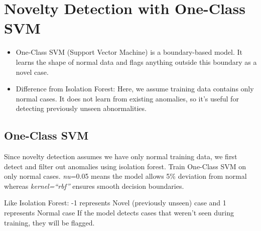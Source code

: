\documentclass[11pt]{article}
\providecommand{\tightlist}{%
      \setlength{\itemsep}{0pt}\setlength{\parskip}{0pt}}
\begin{document}
    \section{Novelty Detection with One-Class
SVM}\label{novelty-detection-with-one-class-svm}

\begin{itemize}
\tightlist
\item
  One-Class SVM (Support Vector Machine) is a boundary-based model. It
  learns the shape of normal data and flags anything outside this
  boundary as a novel case.
\item
  Difference from Isolation Forest: Here, we assume training data
  contains only normal cases. It does not learn from existing anomalies,
  so it's useful for detecting previously unseen abnormalities.
\end{itemize}

\subsection{One-Class SVM}\label{one-class-svm}

Since novelty detection assumes we have only normal training data, we
first detect and filter out anomalies using isolation forest. Train
One-Class SVM on only normal cases. \emph{nu}=0.05 means the model
allows 5\% deviation from normal whereas \emph{kernel=``rbf''} ensures
smooth decision boundaries.

Like Isolation Forest: -1 represents Novel (previously unseen) case and
1 represents Normal case If the model detects cases that weren't seen
during training, they will be flagged.
\end{document}
